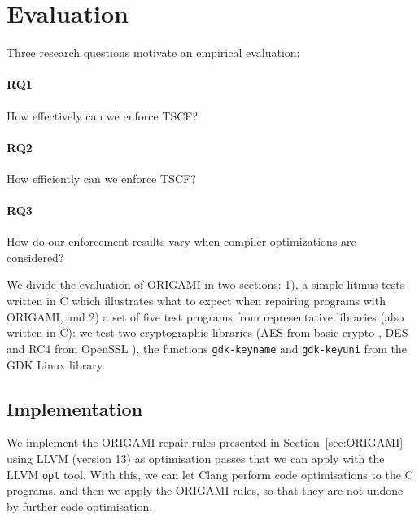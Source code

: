 


{\color{red}
\section{Evaluation}
\label{sec:Evaluation}
Three research questions motivate an empirical evaluation:
\paragraph*{RQ1} How effectively can we enforce TSCF?
\paragraph*{RQ2} How efficiently can we enforce TSCF?
\paragraph*{RQ3} How do our enforcement results vary when compiler optimizations are considered?
%

We divide the evaluation of ORIGAMI in two sections: 1), a simple litmus tests written in C which illustrates what to expect when repairing programs with ORIGAMI, and 2) a set of five test programs from representative libraries (also written in C): we test two cryptographic libraries (AES from basic crypto \cite{AESBasic}, DES and RC4 from OpenSSL \cite{OpenSSL}), the functions \texttt{gdk-keyname} and \texttt{gdk-keyuni} from the GDK Linux library.%

\subsection{Implementation}
\label{sec:Tool} 
We implement the ORIGAMI repair rules presented in Section~\ref{sec:ORIGAMI} using LLVM (version 13) as optimisation passes that we can apply with the LLVM \texttt{opt} tool. With this, we can let Clang perform code optimisations to the C programs, and then we apply the ORIGAMI rules, so that they are not undone by further code optimisation. 

}
